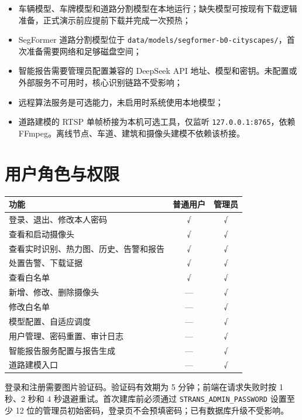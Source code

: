 \begin{itemize}
\tightlist
\item
  车辆模型、车牌模型和道路分割模型在本地运行；缺失模型可按现有下载逻辑准备，正式演示前应提前下载并完成一次预热；
\item
  SegFormer 道路分割模型位于 \texttt{data/\allowbreak{}models/\allowbreak{}segformer-\allowbreak{}b0-\allowbreak{}cityscapes/\allowbreak{}}，首次准备需要网络和足够磁盘空间；
\item
  智能报告需要管理员配置兼容的 DeepSeek API 地址、模型和密钥。未配置或外部服务不可用时，核心识别链路不受影响；
\item
  远程算法服务是可选能力，未启用时系统使用本地模型；
\item
  道路建模的 RTSP 单帧桥接为本机可选工具，仅监听 \texttt{127.\allowbreak{}0.\allowbreak{}0.\allowbreak{}1:\allowbreak{}8765}，依赖 FFmpeg。离线节点、车道、建筑和摄像头建模不依赖该桥接。
\end{itemize}

\section{用户角色与权限}\label{manual-ux7528ux6237ux89d2ux8272ux4e0eux6743ux9650}

\begin{longtable}[]{@{}lcc@{}}
\toprule\noalign{}
功能 & 普通用户 & 管理员 \\
\midrule\noalign{}
\endhead
\bottomrule\noalign{}
\endlastfoot
登录、退出、修改本人密码 & √ & √ \\
查看和启动摄像头 & √ & √ \\
查看实时识别、热力图、历史、告警和报告 & √ & √ \\
处置告警、下载证据 & √ & √ \\
查看白名单 & √ & √ \\
新增、修改、删除摄像头 & --- & √ \\
修改白名单 & --- & √ \\
模型配置、自适应调度 & --- & √ \\
用户管理、密码重置、审计日志 & --- & √ \\
智能报告服务配置与报告生成 & --- & √ \\
道路建模入口 & --- & √ \\
\end{longtable}

登录和注册需要图片验证码。验证码有效期为 5 分钟；前端在请求失败时按 1 秒、2 秒和 4 秒退避重试。首次建库前必须通过 \texttt{S\allowbreak{}T\allowbreak{}R\allowbreak{}A\allowbreak{}N\allowbreak{}S\_\allowbreak{}\allowbreak{}A\allowbreak{}D\allowbreak{}M\allowbreak{}I\allowbreak{}N\_\allowbreak{}\allowbreak{}P\allowbreak{}A\allowbreak{}S\allowbreak{}S\allowbreak{}W\allowbreak{}O\allowbreak{}R\allowbreak{}D} 设置至少 12 位的管理员初始密码，登录页不会预填密码；已有数据库升级不受影响。

